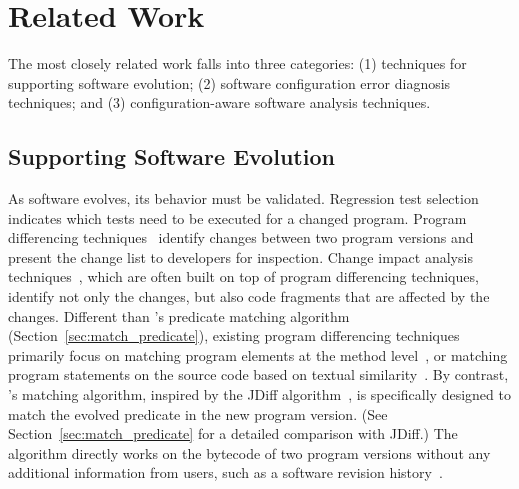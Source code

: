 \section{Related Work}
\label{sec:related}

The most closely related work falls into
three categories: (1) techniques for
supporting software evolution; (2) software
configuration error diagnosis techniques;
and (3) configuration-aware software analysis techniques.

\subsection{Supporting Software Evolution}

As software evolves, its behavior must be validated.
Regression test selection~\cite{regression}
indicates which tests need to be executed for a changed
program.  Program differencing techniques~\cite{Giroux:2006:DIF, Xing:2005:UAO, Thummalapenta:2010:ESM, Kim:2013, Jin:2012:BRF,Nguyen:2010:RBF,Dig:2006:ADR, Kamiya:2002:CMT, Dagenais:2008}
identify changes between two program versions
and present the change list to developers for inspection.
Change impact analysis techniques~\cite{STVR:STVR1475}, which
are often built on top of program differencing
techniques, identify not only the changes, but also
code fragments that are affected by the changes. 
Different than \ourtool's predicate matching
algorithm (Section~\ref{sec:match_predicate}),
existing program differencing techniques primarily focus on matching
program elements at the method level~\cite{frameworkevolution,
Xing:2005:UAO, Kim:2013, Nguyen:2010:RBF,Dig:2006:ADR,
Kamiya:2002:CMT, Dagenais:2008, Zhang:2011ICSM},
or matching program statements on the source code based on
textual similarity~\cite{Horwitz:1990:IST}.
By contrast, \ourtool's matching algorithm, inspired by
the JDiff algorithm~\cite{Apiwattanapong:2004}, is specifically designed 
to match the evolved predicate in the new program version.
(See Section~\ref{sec:match_predicate} for a detailed
comparison with JDiff.)
The algorithm directly works on the bytecode of two program
versions without any additional information from users,
such as a software revision history~\cite{frameworkevolution}.


